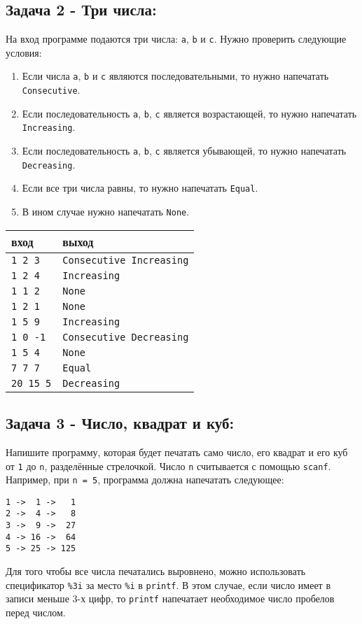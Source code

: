 \documentclass{article}
\begin{document}
\subsection*{Задача 2 - Три числа:}
На вход программе подаются три числа: \texttt{a}, \texttt{b} и \texttt{c}. Нужно проверить следующие условия:
\begin{enumerate}
\item Если числа \texttt{a}, \texttt{b} и \texttt{c} являются последовательными, то нужно напечатать \texttt{Consecutive}.
\item Если последовательность \texttt{a}, \texttt{b}, \texttt{c} является возрастающей, то нужно напечатать \texttt{Increasing}.
\item Если последовательность \texttt{a}, \texttt{b}, \texttt{c} является убывающей, то нужно напечатать \texttt{Decreasing}.
\item Если все три числа равны, то нужно напечатать \texttt{Equal}.
\item В ином случае нужно напечатать \texttt{None}.
\end{enumerate}

\begin{center}
\begin{tabular}{ l l }
 вход & выход \\ \hline
 \texttt{1 2 3} & \texttt{Consecutive Increasing}  \\ 
 \texttt{1 2 4} & \texttt{Increasing}  \\
 \texttt{1 1 2} & \texttt{None} \\ 
 \texttt{1 2 1} & \texttt{None} \\ 
 \texttt{1 5 9} & \texttt{Increasing}  \\ 
 \texttt{1 0 -1} & \texttt{Consecutive Decreasing}  \\ 
 \texttt{1 5 4} & \texttt{None} \\ 
 \texttt{7 7 7} & \texttt{Equal} \\  
 \texttt{20 15 5} & \texttt{Decreasing} \\
\end{tabular}
\end{center}


\subsection*{Задача 3 - Число, квадрат и куб:} 
Напишите программу, которая будет печатать само число, его квадрат и его куб от \texttt{1} до \texttt{n}, разделённые стрелочкой.
Число \texttt{n} считывается с помощью \texttt{scanf}. 
Например, при \texttt{n = 5}, программа должна напечатать следующее:
\begin{verbatim}
1 ->  1 ->   1
2 ->  4 ->   8
3 ->  9 ->  27
4 -> 16 ->  64
5 -> 25 -> 125
\end{verbatim}
Для того чтобы все числа печатались выровнено, можно использовать спецификатор \texttt{\%3i} за место \texttt{\%i} в \texttt{printf}. В этом случае, если число имеет в записи меньше 3-х цифр, то \texttt{printf} напечатает необходимое число пробелов перед числом.
\end{document}
